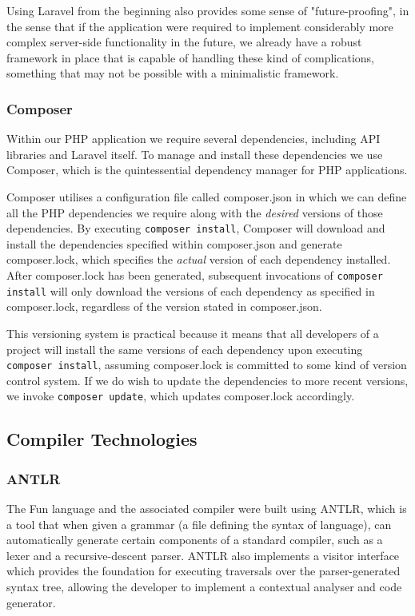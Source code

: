\documentclass{l4proj}
\begin{document}
Using Laravel from the beginning also provides some sense of "future-proofing", in the sense that if the application were required to implement considerably more complex server-side functionality in the future, we already have a robust framework in place that is capable of handling these kind of complications, something that may not be possible with a minimalistic framework.

\subsubsection{Composer}
Within our PHP application we require several dependencies, including API libraries and Laravel itself. To manage and install these dependencies we use Composer, which is the quintessential dependency manager for PHP applications.

Composer utilises a configuration file called \textsf{composer.json} in which we can define all the PHP dependencies we require along with the \textit{desired} versions of those dependencies. By executing \texttt{composer install}, Composer will download and install the dependencies specified within \textsf{composer.json} and generate \textsf{composer.lock}, which specifies the \textit{actual} version of each dependency installed. After \textsf{composer.lock} has been generated, subsequent invocations of \texttt{composer install} will only download the versions of each dependency as specified in \textsf{composer.lock}, regardless of the version stated in \textsf{composer.json}. 

This versioning system is practical because it means that all developers of a project will install the same versions of each dependency upon executing \texttt{composer install}, assuming \textsf{composer.lock} is committed to some kind of version control system. If we do wish to update the dependencies to more recent versions, we invoke \texttt{composer update}, which updates \textsf{composer.lock} accordingly. 

\subsection{Compiler Technologies}
\subsubsection{ANTLR}
The Fun language and the associated compiler were built using ANTLR, which is a tool that when given a grammar (a file defining the syntax of language), can automatically generate certain components of a standard compiler, such as a lexer and a recursive-descent parser. ANTLR also implements a visitor interface which provides the foundation for executing traversals over the parser-generated syntax tree, allowing the developer to implement a contextual analyser and code generator. 
\end{document}
